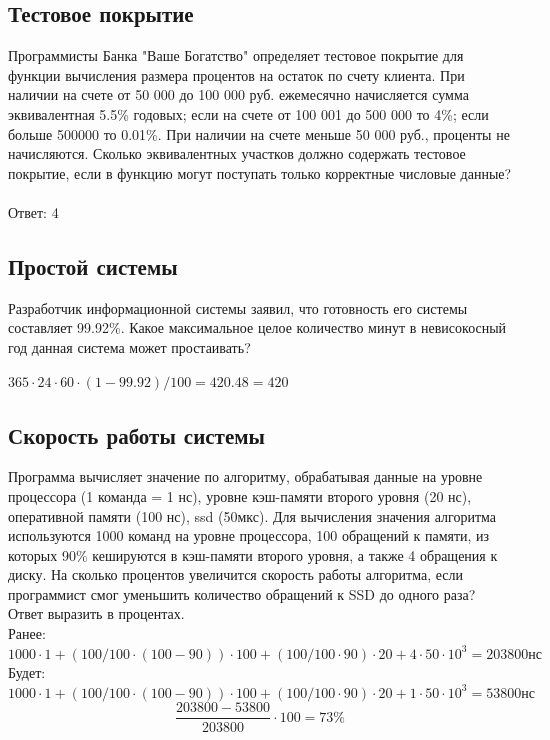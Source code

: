 \documentclass{article}
\begin{document}
\subsection{Тестовое покрытие}

Программисты Банка "Ваше Богатство" определяет тестовое покрытие для функции вычисления размера процентов на остаток по счету клиента. 
При наличии на счете от 50 000 до 100 000 руб. ежемесячно начисляется сумма эквивалентная 5.5\% годовых; 
если на счете от 100 001 до 500 000 то 4\%;
если больше 500000 то 0.01\%. 
При наличии на счете меньше 50 000 руб., проценты не начисляются. 
Сколько эквивалентных участков должно содержать тестовое покрытие, если в функцию могут поступать только корректные числовые данные?
\\ \\
Ответ: 4

\subsection{Простой системы}

Разработчик информационной системы заявил, что готовность его системы составляет 99.92\%. 
Какое максимальное целое количество минут в невисокосный год данная система может простаивать?

$365 \cdot 24 \cdot 60 \cdot (1-99.92)/100 = 420.48 = 420$

\subsection{Скорость работы системы}

Программа вычисляет значение по алгоритму, 
обрабатывая данные на уровне процессора (1 команда = 1 нс), уровне кэш-памяти второго уровня (20 нс), оперативной памяти (100 нс), ssd (50мкс). 
Для вычисления значения алгоритма используются 1000 команд на уровне процессора, 100 обращений к памяти, из которых 90\% кешируются в кэш-памяти второго уровня, а также 4 обращения к диску. 
На сколько процентов увеличится скорость работы алгоритма, если программист смог уменьшить количество обращений к SSD до одного раза? Ответ выразить в процентах.
\\
Ранее: $1000 \cdot 1 + (100/100 \cdot (100-90)) \cdot 100 + (100/100 \cdot 90)\cdot 20 + 4\cdot 50\cdot 10^3 = 203800 нс$
\\
Будет: $1000 \cdot 1 + (100/100 \cdot (100-90)) \cdot 100 + (100/100 \cdot 90)\cdot 20 + 1\cdot 50\cdot 10^3 = 53800 нс$
\\
\[\frac{203800-53800}{203800} \cdot 100 = 73\%\]
\end{document}
